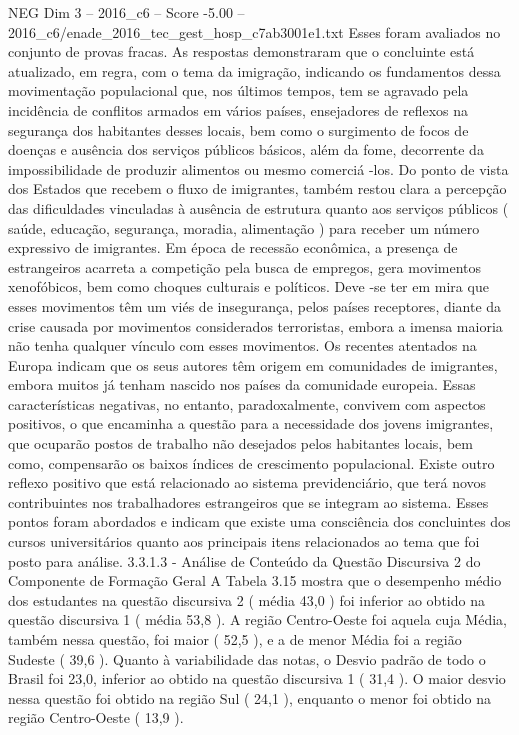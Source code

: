 \begin{textsample}{NEG Dim 3 – 2016\_c6 – Score -5.00 – 2016\_c6/enade\_2016\_tec\_gest\_hosp\_c7ab3001e1.txt}
Esses foram avaliados no conjunto de provas fracas.
As respostas demonstraram que o concluinte está atualizado, em regra, com o tema da imigração, indicando os fundamentos dessa movimentação populacional que, nos últimos tempos, tem se agravado pela incidência de conflitos armados em vários países, ensejadores de reflexos na segurança dos habitantes desses locais, bem como o surgimento de focos de doenças e ausência dos serviços públicos básicos, além da fome, decorrente da impossibilidade de produzir alimentos ou mesmo comerciá -los.
Do ponto de vista dos Estados que recebem o fluxo de imigrantes, também restou clara a percepção das dificuldades vinculadas à ausência de estrutura quanto aos serviços públicos ( saúde, educação, segurança, moradia, alimentação ) para receber um número expressivo de imigrantes.
Em época de recessão econômica, a presença de estrangeiros acarreta a competição pela busca de empregos, gera movimentos xenofóbicos, bem como choques culturais e políticos.
Deve -se ter em mira que esses movimentos têm um viés de insegurança, pelos países receptores, diante da crise causada por movimentos considerados terroristas, embora a imensa maioria não tenha qualquer vínculo com esses movimentos.
Os recentes atentados na Europa indicam que os seus autores têm origem em comunidades de imigrantes, embora muitos já tenham nascido nos países da comunidade europeia.
Essas características negativas, no entanto, paradoxalmente, convivem com aspectos positivos, o que encaminha a questão para a necessidade dos jovens imigrantes, que ocuparão postos de trabalho não desejados pelos habitantes locais, bem como, compensarão os baixos índices de crescimento populacional.
Existe outro reflexo positivo que está relacionado ao sistema previdenciário, que terá novos contribuintes nos trabalhadores estrangeiros que se integram ao sistema.
Esses pontos foram abordados e indicam que existe uma consciência dos concluintes dos cursos universitários quanto aos principais itens relacionados ao tema que foi posto para análise. 3.3.1.3 - Análise de Conteúdo da Questão Discursiva 2 do Componente de Formação Geral A Tabela 3.15 mostra que o desempenho médio dos estudantes na questão discursiva 2 ( média 43,0 ) foi inferior ao obtido na questão discursiva 1 ( média 53,8 ).
A região Centro-Oeste foi aquela cuja Média, também nessa questão, foi maior ( 52,5 ), e a de menor Média foi a região Sudeste ( 39,6 ).
Quanto à variabilidade das notas, o Desvio padrão de todo o Brasil foi 23,0, inferior ao obtido na questão discursiva 1 ( 31,4 ).
O maior desvio nessa questão foi obtido na região Sul ( 24,1 ), enquanto o menor foi obtido na região Centro-Oeste ( 13,9 ).

\end{textsample}
